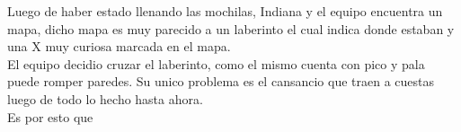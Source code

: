 Luego de haber estado llenando las mochilas, Indiana y el equipo encuentra un mapa, dicho mapa es muy parecido a un laberinto el cual indica donde estaban y una X muy curiosa marcada en el mapa.\\
El equipo decidio cruzar el laberinto, como el mismo cuenta con pico y pala puede romper paredes. Su unico problema es el cansancio que traen a cuestas luego de todo lo hecho hasta ahora.\\
Es por esto que 